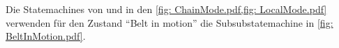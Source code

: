 \documentclass[./\jobname.tex]{subfiles}
\begin{document}
%
Die Statemachines von \modeA und \modeB in den \cref{fig: ChainMode.pdf,fig: LocalMode.pdf} verwenden für den Zustand \enquote{Belt in motion} die Subsubstatemachine in \autoref{fig: BeltInMotion.pdf}.
%
\begin{figure}[H]
	\centering
	\noindent{}
	\label{fig: BeltInMotion.pdf}
\end{figure}
%
\newpage
\end{document}
